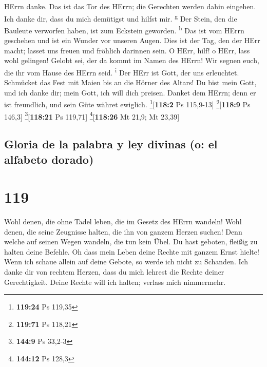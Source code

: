 HErrn danke.  Das ist das Tor des HErrn; die Gerechten
werden dahin eingehen.  Ich danke dir, dass du mich
demütigst und hilfst mir. \textsuperscript{g}  Der Stein,
den die Bauleute verworfen haben, ist zum Eckstein geworden.
\textsuperscript{h}  Das ist vom HErrn geschehen und ist
ein Wunder vor unseren Augen.  Dies ist der Tag, den der
HErr macht; lasset uns freuen und fröhlich darinnen sein.
 O HErr, hilf! o HErr, lass wohl gelingen!
 Gelobt sei, der da kommt im Namen des HErrn! Wir segnen
euch, die ihr vom Hause des HErrn seid. \textsuperscript{i}
 Der HErr ist Gott, der uns erleuchtet. Schmücket das
Fest mit Maien bis an die Hörner des Altars!  Du bist
mein Gott, und ich danke dir; mein Gott, ich will dich preisen.
 Danket dem HErrn; denn er ist freundlich, und sein Güte
währet ewiglich. \footnote{\textbf{119:24} Ps 119,35}{[}\textbf{118:2}
Ps 115,9-13{]} \footnote{\textbf{119:71} Ps 118,21}{[}\textbf{118:9} Ps
146,3{]} \footnote{\textbf{144:9} Ps 33,2-3}{[}\textbf{118:21} Ps
119,71{]} \footnote{\textbf{144:12} Ps 128,3}{[}\textbf{118:26} Mt 21,9;
Mt 23,39{]}

\hypertarget{gloria-de-la-palabra-y-ley-divinas-o-el-alfabeto-dorado}{%
\subsection{Gloria de la palabra y ley divinas (o: el alfabeto
dorado)}\label{gloria-de-la-palabra-y-ley-divinas-o-el-alfabeto-dorado}}

\hypertarget{section-118}{%
\section{119}\label{section-118}}

 Wohl denen, die ohne Tadel leben, die im Gesetz des HErrn
wandeln!  Wohl denen, die seine Zeugnisse halten, die ihn
von ganzem Herzen suchen!  Denn welche auf seinen Wegen
wandeln, die tun kein Übel.  Du hast geboten, fleißig zu
halten deine Befehle.  Oh dass mein Leben deine Rechte mit
ganzem Ernst hielte!  Wenn ich schaue allein auf deine
Gebote, so werde ich nicht zu Schanden.  Ich danke dir von
rechtem Herzen, dass du mich lehrest die Rechte deiner Gerechtigkeit.
 Deine Rechte will ich halten; verlass mich nimmermehr.

